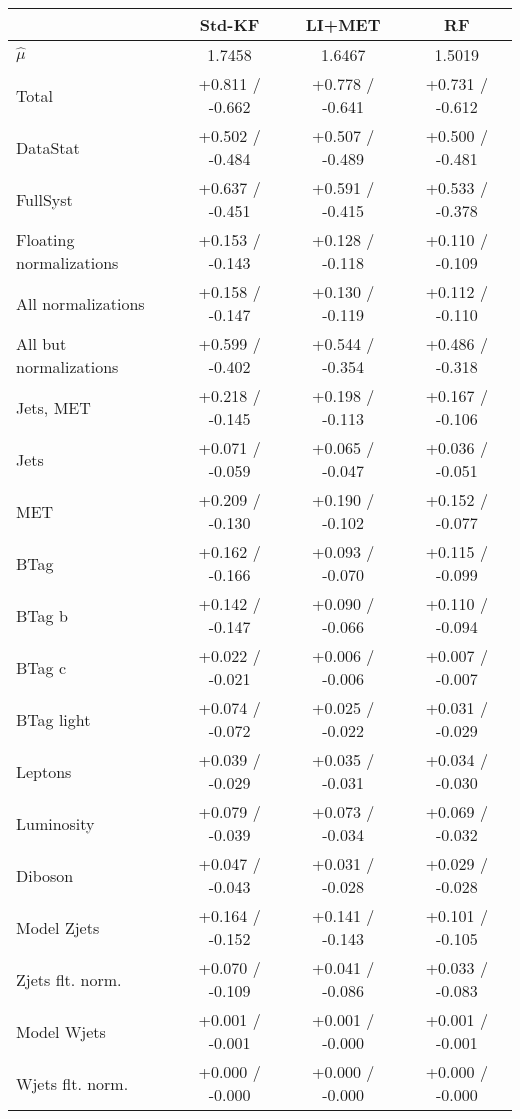 \begin{enumeate}
\begin{table}[!htbp]
\begin{center}
\begin{tabular}{lccc}
\hline\hline
 &Std-KF &LI+MET &RF\\
\hline
$\hat{\mu}$ & 1.7458 & 1.6467 & 1.5019\\
\hline
Total &  +0.811 / -0.662  &  +0.778 / -0.641  &  +0.731 / -0.612 \\
\hline
DataStat &  +0.502 / -0.484  &  +0.507 / -0.489  &  +0.500 / -0.481 \\
FullSyst &  +0.637 / -0.451  &  +0.591 / -0.415  &  +0.533 / -0.378 \\
Floating normalizations &  +0.153 / -0.143  &  +0.128 / -0.118  &  +0.110 / -0.109 \\
All normalizations &  +0.158 / -0.147  &  +0.130 / -0.119  &  +0.112 / -0.110 \\
All but normalizations &  +0.599 / -0.402  &  +0.544 / -0.354  &  +0.486 / -0.318 \\
\hline
Jets, MET &  +0.218 / -0.145  &  +0.198 / -0.113  &  +0.167 / -0.106 \\
Jets &  +0.071 / -0.059  &  +0.065 / -0.047  &  +0.036 / -0.051 \\
MET &  +0.209 / -0.130  &  +0.190 / -0.102  &  +0.152 / -0.077 \\
BTag &  +0.162 / -0.166  &  +0.093 / -0.070  &  +0.115 / -0.099 \\
BTag b &  +0.142 / -0.147  &  +0.090 / -0.066  &  +0.110 / -0.094 \\
BTag c &  +0.022 / -0.021  &  +0.006 / -0.006  &  +0.007 / -0.007 \\
BTag light &  +0.074 / -0.072  &  +0.025 / -0.022  &  +0.031 / -0.029 \\
Leptons &  +0.039 / -0.029  &  +0.035 / -0.031  &  +0.034 / -0.030 \\
Luminosity &  +0.079 / -0.039  &  +0.073 / -0.034  &  +0.069 / -0.032 \\
Diboson &  +0.047 / -0.043  &  +0.031 / -0.028  &  +0.029 / -0.028 \\
Model Zjets &  +0.164 / -0.152  &  +0.141 / -0.143  &  +0.101 / -0.105 \\
Zjets flt. norm. &  +0.070 / -0.109  &  +0.041 / -0.086  &  +0.033 / -0.083 \\
Model Wjets &  +0.001 / -0.001  &  +0.001 / -0.000  &  +0.001 / -0.001 \\
Wjets flt. norm. &  +0.000 / -0.000  &  +0.000 / -0.000  &  +0.000 / -0.000 \\

\end{tabular}
\end{center}
\end{table}
\end{enumeate}
